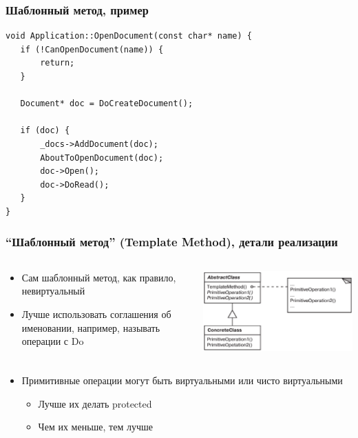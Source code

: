 \documentclass{../../slides-style}
\begin{document}
    \begin{frame}[fragile]
        \frametitle{Шаблонный метод, пример}
        \begin{verbatim}
void Application::OpenDocument(const char* name) {
   if (!CanOpenDocument(name)) {
       return;
   }

   Document* doc = DoCreateDocument();
  
   if (doc) {
       _docs->AddDocument(doc);
       AboutToOpenDocument(doc);
       doc->Open();
       doc->DoRead();
   }
}
        \end{verbatim}
    \end{frame}

    \begin{frame}
        \frametitle{``Шаблонный метод'' (Template Method), детали реализации}
        \begin{columns}
            \begin{column}{0.5\textwidth}
                \begin{itemize}
                    \item Сам шаблонный метод, как правило, невиртуальный
                    \item Лучше использовать соглашения об именовании, например, называть операции с Do
                \end{itemize}
            \end{column}
            \begin{column}{0.4\textwidth}
                \begin{center}
                    \includegraphics[width=\textwidth]{templateMethod.png}
                \end{center}
            \end{column}
        \end{columns}
        \begin{itemize}
            \item Примитивные операции могут быть виртуальными или чисто виртуальными
            \begin{itemize}
                \item Лучше их делать protected
                \item Чем их меньше, тем лучше
            \end{itemize}
        \end{itemize}
    \end{frame}
\end{document}
